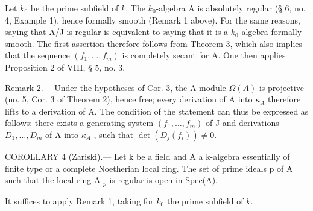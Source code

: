 Let \(k_0\) be the prime subfield of \(k\). The \(k_0\)-algebra A is absolutely regular (§ 6, no. 4, Example 1), hence formally smooth (Remark 1 above). For the same reasons, saying that A/J is regular is equivalent to saying that it is a \(k_0\)-algebra formally smooth. The first assertion therefore follows from Theorem 3, which also implies that the sequence \((f_1,\ldots,f_m)\) is completely secant for A. One then applies Proposition 2 of VIII, § 5, no. 3.

Remark 2.--- Under the hypotheses of Cor. 3, the A-module \(\Omega(A)\) is projective (no. 5, Cor. 3 of Theorem 2), hence free; every derivation of A into \(\kappa_{A}\) therefore lifts to a derivation of A. The condition of the statement can thus be expressed as follows: there exists a generating system \((f_{1},\ldots,f_{m})\) of J and derivations \(D_{1},\ldots,D_{m}\) of A into \(\kappa_{A}\) , such that \(\det(D_{j}(f_{i}))\neq0\).

COROLLARY 4 (Zariski).--- Let k be a field and A a k-algebra essentially of finite type or a complete Noetherian local ring. The set of prime ideals p of A such that the local ring A \(_{p}\) is regular is open in Spec(A).

It suffices to apply Remark 1, taking for \(k_0\) the prime subfield of \(k\).

